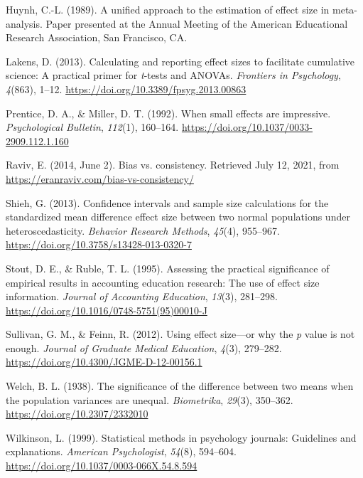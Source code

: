 \documentclass[
  english,
  man,floatsintext]{apa6}
\newlength{\cslhangindent}
\newlength{\cslentryspacingunit} %
\newenvironment{CSLReferences}[2] %
 {%
  \setlength{\parindent}{0pt}
  \ifodd #1
  \let\oldpar\par
  \def\par{\hangindent=\cslhangindent\oldpar}
  \fi
  \setlength{\parskip}{#2\cslentryspacingunit}
 }%
 {}
\begin{document}
\begin{CSLReferences}{1}{0}
\leavevmode{}%
Huynh, C.-L. (1989). A unified approach to the estimation of effect size in meta-analysis. Paper presented at the {A}nnual {M}eeting of the {A}merican {E}ducational {R}esearch {A}ssociation, San Francisco, CA.

\leavevmode{}%
Lakens, D. (2013). Calculating and reporting effect sizes to facilitate cumulative science: A practical primer for \emph{t}-tests and {ANOVAs}. \emph{Frontiers in Psychology}, \emph{4}(863), 1--12. \url{https://doi.org/10.3389/fpsyg.2013.00863}

\leavevmode{}%
Prentice, D. A., \& Miller, D. T. (1992). When small effects are impressive. \emph{Psychological Bulletin}, \emph{112}(1), 160--164. \url{https://doi.org/10.1037/0033-2909.112.1.160}

\leavevmode{}%
Raviv, E. (2014, June 2). Bias vs. consistency. Retrieved July 12, 2021, from \url{https://eranraviv.com/bias-vs-consistency/}

\leavevmode{}%
Shieh, G. (2013). Confidence intervals and sample size calculations for the standardized mean difference effect size between two normal populations under heteroscedasticity. \emph{Behavior Research Methods}, \emph{45}(4), 955--967. \url{https://doi.org/10.3758/s13428-013-0320-7}

\leavevmode{}%
Stout, D. E., \& Ruble, T. L. (1995). Assessing the practical significance of empirical results in accounting education research: The use of effect size information. \emph{Journal of Accounting Education}, \emph{13}(3), 281--298. \url{https://doi.org/10.1016/0748-5751(95)00010-J}

\leavevmode{}%
Sullivan, G. M., \& Feinn, R. (2012). Using effect size---or why the \emph{p} value is not enough. \emph{Journal of Graduate Medical Education}, \emph{4}(3), 279--282. \url{https://doi.org/10.4300/JGME-D-12-00156.1}

\leavevmode{}%
Welch, B. L. (1938). The significance of the difference between two means when the population variances are unequal. \emph{Biometrika}, \emph{29}(3), 350--362. \url{https://doi.org/10.2307/2332010}

\leavevmode{}%
Wilkinson, L. (1999). Statistical methods in psychology journals: Guidelines and explanations. \emph{American Psychologist}, \emph{54}(8), 594--604. \url{https://doi.org/10.1037/0003-066X.54.8.594}

\end{CSLReferences}
\end{document}
